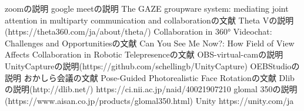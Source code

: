 
zoomの説明
google meetの説明
The GAZE groupware system: mediating joint attention in multiparty communication and collaborationの文献
Theta Vの説明(https://theta360.com/ja/about/theta/)
Collaboration in 360° Videochat: Challenges and Opportunitiesの文献
Can You See Me Now?: How Field of View Affects Collaboration in Robotic Telepresenceの文献
OBS-virtual-camの説明
UnityCaptureの説明(https://github.com/schellingb/UnityCapture)
OEBStudioの説明
おかしら会議の文献
Pose-Guided Photorealistic Face Rotationの文献
Dlibの説明(http://dlib.net/)
https://ci.nii.ac.jp/naid/40021907210
glomal 350の説明(https://www.aisan.co.jp/products/glomal350.html)
Unity https://unity.com/ja